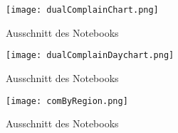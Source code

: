 \begin{figure}[t] 
	\centering
	\texttt{[image: dualComplainChart.png]}
	\caption[Ausschnitt des Notebooks]{Ausschnitt des Notebooks}
	\label{fig:zeppelin1}
\end{figure}
\begin{figure}[h] 
	\centering
	\texttt{[image: dualComplainDaychart.png]}
	\caption[Ausschnitt des Notebooks]{Ausschnitt des Notebooks}
	\label{fig:zeppelin2}
\end{figure}
\begin{figure}[h] 
	\centering
	\texttt{[image: comByRegion.png]}
	\caption[Ausschnitt des Notebooks]{Ausschnitt des Notebooks}
	\label{fig:zeppelin3}
\end{figure}


